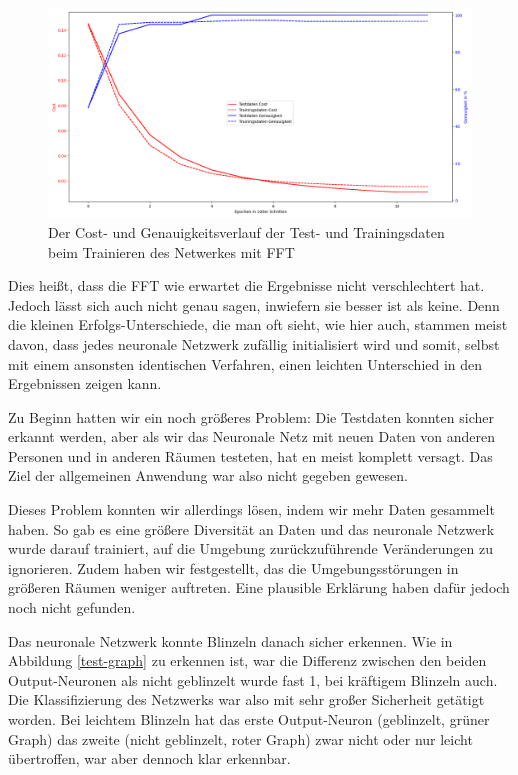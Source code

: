 \documentclass[11pt]{scrartcl}
\begin{document}
	\begin{figure}[H]
		\includegraphics[width=\textwidth]{pictures/training-fft2.png}
		\caption{Der Cost- und Genauigkeitsverlauf der Test- und Trainingsdaten beim Trainieren des Netwerkes mit FFT}
		\label{training-fft}
	\end{figure}

	Dies heißt, dass die FFT wie erwartet die Ergebnisse nicht verschlechtert hat. Jedoch lässt sich auch nicht genau sagen, inwiefern sie besser ist als keine. Denn die kleinen Erfolgs-Unterschiede, die man oft sieht, wie hier auch, stammen meist davon, dass jedes neuronale Netzwerk zufällig initialisiert wird und somit, selbst mit einem ansonsten identischen Verfahren, einen leichten Unterschied in den Ergebnissen zeigen kann.

	Zu Beginn hatten wir ein noch größeres Problem: Die Testdaten konnten sicher erkannt werden, aber als wir das Neuronale Netz mit neuen Daten von anderen Personen und in anderen Räumen testeten, hat en meist komplett versagt. Das Ziel der allgemeinen Anwendung war also nicht gegeben gewesen. 

	Dieses Problem konnten wir allerdings lösen, indem wir mehr Daten gesammelt haben. So gab es eine größere Diversität an Daten und das neuronale Netzwerk wurde darauf trainiert, auf die Umgebung zurückzuführende Veränderungen zu ignorieren. Zudem haben wir festgestellt, das die Umgebungsstörungen in größeren Räumen weniger auftreten. Eine plausible Erklärung haben dafür jedoch noch nicht gefunden.

	Das neuronale Netzwerk konnte Blinzeln danach sicher erkennen. Wie in Abbildung \ref{test-graph} zu erkennen ist, war die Differenz zwischen den beiden Output-Neuronen als nicht geblinzelt wurde fast 1, bei kräftigem Blinzeln auch. Die Klassifizierung des Netzwerks war also mit sehr großer Sicherheit getätigt worden. Bei leichtem Blinzeln hat das erste Output-Neuron (geblinzelt, grüner Graph) das zweite (nicht geblinzelt, roter Graph) zwar nicht oder nur leicht übertroffen, war aber dennoch klar erkennbar.
\end{document}
